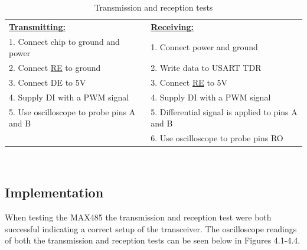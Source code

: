 \begin{table}[H]
\centering
    \begin{tabular}{|l|l|}
    \hline
            \textbf{\underline{Transmitting:}}&\textbf{\underline{Receiving:}}\\
            1. Connect chip to ground and power          & 1. Connect power and ground\\
            2. Connect \underline{RE} to ground          & 2. Write data to USART TDR\\
            3. Connect DE to 5V                          & 3. Connect \underline{RE} to 5V\\
            4. Supply DI with a PWM signal               & 4. Supply DI with a PWM signal\\
            5. Use oscilloscope to probe pins A and B    & 5. Differential signal is applied to pins A and B\\
                                                         & 6. Use oscilloscope to probe pins RO \\
                                  \hline
    \end{tabular}\
    \vspace{-3mm}
    \caption{Transmission and reception tests}
    \vspace{-13mm}
\end{table}

\subsection{Implementation}
\vspace{-7mm}
When testing the MAX485 the transmission and reception test were both successful indicating a correct setup of the transceiver. The oscilloscope readings of both the transmission and reception tests can be seen below in Figures 4.1-4.4.

